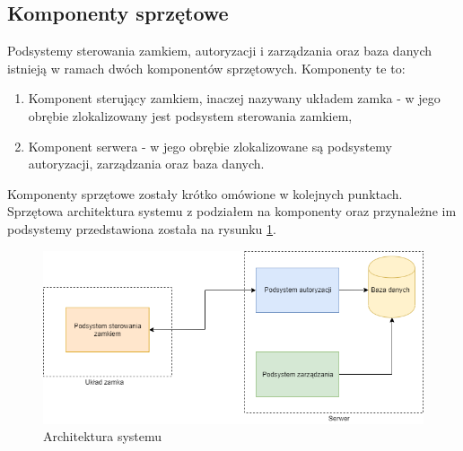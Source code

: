             \subsection{Komponenty sprzętowe}

                Podsystemy sterowania zamkiem, autoryzacji i zarządzania oraz baza danych istnieją w ramach dwóch komponentów sprzętowych. Komponenty te to:
                \begin{enumerate}
                    \item Komponent sterujący zamkiem, inaczej nazywany układem zamka - w jego obrębie zlokalizowany jest podsystem sterowania zamkiem,
                    \item Komponent serwera - w jego obrębie zlokalizowane są podsystemy autoryzacji, zarządzania oraz baza danych.
                \end{enumerate}

                Komponenty sprzętowe zostały krótko omówione w kolejnych punktach. Sprzętowa architektura systemu z podziałem na komponenty oraz przynależne im podsystemy przedstawiona została na rysunku \ref{fig:hl-arch}.

                \begin{figure}[]
                    \includegraphics[width=\linewidth]{chapters/images/hl-arch3.png}
                    \caption{Architektura systemu}
                    \label{fig:hl-arch}
                \end{figure}

